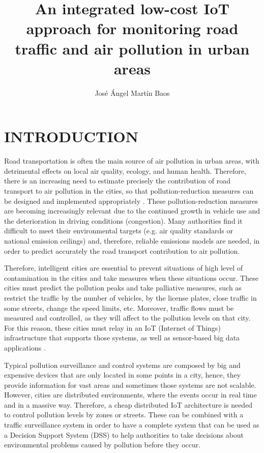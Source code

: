 \documentclass{pre-tfg}
\title{An integrated low-cost IoT approach for monitoring road traffic and air pollution in urban areas}
\author{José Ángel Martín Baos}
\begin{document}
\maketitle
\tableofcontents

\newpage


\section{INTRODUCTION}

Road transportation is often the main source of air pollution in urban areas, with detrimental effects on local air quality, ecology, and human health. Therefore, there is an increasing need to estimate precisely the contribution of road transport to air pollution in the cities, so that pollution-reduction measures can be designed and implemented appropriately \cite{SNB10}. These pollution-reduction measures are becoming increasingly relevant due to the continued growth in vehicle use and the deterioration in driving conditions (congestion). Many authorities find it difficult to meet their environmental targets (e.g. air quality standards or national emission ceilings) and, therefore, reliable emissions models are needed, in order to predict accurately the road transport contribution to air pollution.

Therefore, intelligent cities are essential to prevent situations of high level of contamination in the cities and take measures when these situations occur. These cities must predict the pollution peaks and take palliative measures, such as restrict the traffic by the number of vehicles, by the license plates, close traffic in some streets, change the speed limits, etc. Moreover, traffic flows must be measured and controlled, as they will affect to the pollution levels on that city. For this reason, these cities must relay in an IoT (Internet of Things) infrastructure that supports those systems, as well as sensor-based big data applications \cite{Bib18}.



Typical pollution surveillance and control systems are composed by big and expensive devices that are only located in some points in a city, hence, they provide information for vast areas and sometimes those systems are not scalable. However, cities are distributed environments, where the events occur in real time and in a massive way. Therefore, a cheap distributed IoT architecture is needed to control pollution levels by zones or streets. These can be combined with a traffic surveillance system in order to have a complete system that can be used as a Decision Support System (DSS) to help authorities to take decisions about environmental problems caused by pollution before they occur.
\end{document}
